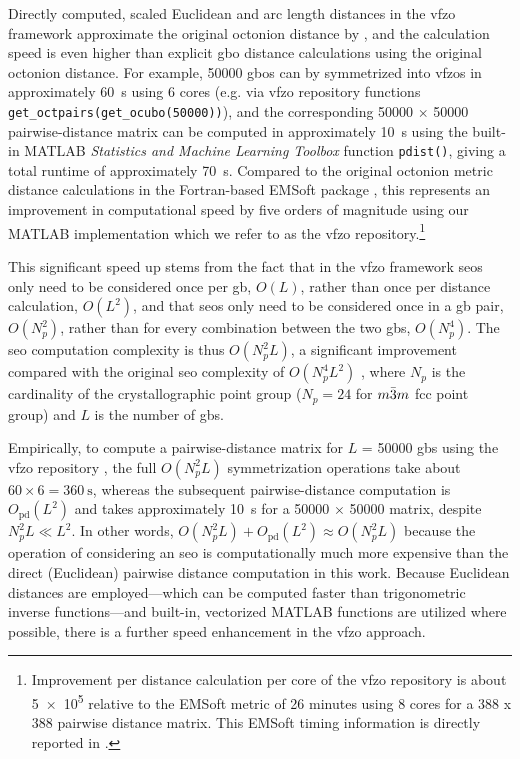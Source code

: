 \documentclass[final,twocolumn,12pt]{elsarticle}
\newcommand{\vfzorepo}{\gls{vfzo} repository}
\begin{document}
Directly computed, scaled Euclidean and arc length distances in the \gls{vfzo} framework approximate the original octonion distance by \citet{francisGeodesicOctonionMetric2019}, and the calculation speed is even higher than explicit \gls{gbo} distance calculations using the original octonion distance. For example, \num{50000} \glspl{gbo} can by symmetrized into \glspl{vfzo} in approximately \SI{60}{\second} using 6 cores (e.g. via \vfzorepo{} functions \texttt{get\_octpairs(get\_ocubo(50000))}), and the corresponding \num{50000} $\times$ \num{50000} pairwise-distance matrix can be computed in approximately \SI{10}{\second} using the built-in MATLAB \textit{Statistics and Machine Learning Toolbox} function \texttt{pdist()}, giving a total runtime of approximately \SI{70}{\second}. Compared to the original octonion metric distance calculations \cite{chesserLearningGrainBoundary2020} in the Fortran-based EMSoft package \cite{degraefEMSoft2020}, this represents an improvement in computational speed by five orders of magnitude using our MATLAB implementation \cite{bairdFiveDegreeofFreedom5DOF2020} which we refer to as the \vfzorepo{}.\footnote{Improvement per distance calculation per core of the \vfzorepo{} is about \num{5e5} relative to the EMSoft \cite{degraefEMSoft2020} metric of 26 minutes using 8 cores for a 388 x 388 pairwise distance matrix. This EMSoft timing information is directly reported in \cite{chesserLearningGrainBoundary2020}.}

This significant speed up stems from the fact that in the \gls{vfzo} framework \glspl{seo} only need to be considered once per \gls{gb}, $O(L)$, rather than once per distance calculation, $O(L^2)$,
and that \glspl{seo} only need to be considered once in a \gls{gb} pair, $O(N_p^2)$, rather than for every combination between the two \glspl{gb}, $O(N_p^4)$. The \gls{seo} computation complexity is thus $O(N_p^2L)$, a significant improvement compared with the original \gls{seo} complexity of $O(N_p^4L^2)$ \cite{chesserLearningGrainBoundary2020}, where $N_p$ is the cardinality of the crystallographic point group ($N_p=24$ for $m\Bar{3}m$ \gls{fcc} point group) and $L$ is the number of \glspl{gb}. 

Empirically, to compute a pairwise-distance matrix for $L$ = \num{50000} \glspl{gb} using the \vfzorepo{} \cite{bairdFiveDegreeofFreedom5DOF2020}, the full $O(N_p^2L)$ symmetrization operations take about $60\times 6 = \SI{360}{\second}$, whereas the subsequent pairwise-distance computation is $O_{\text{pd}}(L^2)$ and takes approximately \SI{10}{\second} for a \num{50000} $\times$ \num{50000} matrix, despite $N_p^2L \ll L^2$. In other words, $O(N_p^2L)+O_\text{pd}(L^2)\approx O(N_p^2L)$  because the operation of considering an \gls{seo} is computationally much more expensive than the direct (Euclidean) pairwise distance computation in this work. Because Euclidean distances are employed---which can be computed faster than trigonometric inverse functions---and built-in, vectorized MATLAB functions are utilized where possible, there is a further speed enhancement in the \gls{vfzo} approach. %
\end{document}
